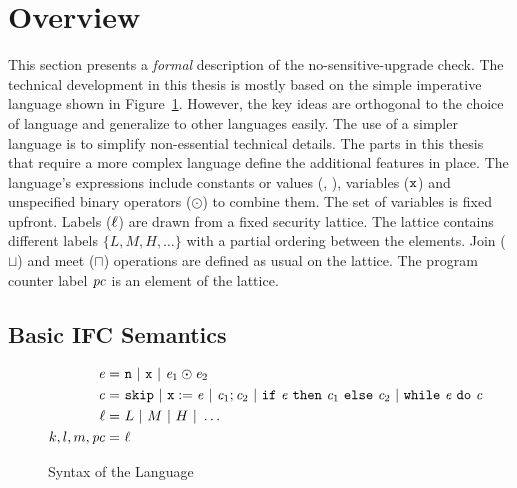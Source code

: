 \section{Overview}
This section presents a \emph{formal} description of the
no-sensitive-upgrade check. The technical development in this thesis
is mostly based on the simple imperative language shown in
Figure~\ref{basic:syntax}. However, the key ideas are orthogonal to
the choice of language and generalize to 
other languages easily. The use of a simpler language is to simplify
non-essential technical details. The parts in this thesis that require
a more complex language define the additional features in place. 
The language's expressions include constants or values (, ),
variables ($\texttt{x}$) and unspecified binary operators ($\odot$) to 
combine them. The set of variables is fixed upfront. Labels ($\ell$)
are drawn from a fixed security lattice. The lattice contains
different labels $\{L, M, H, \ldots \}$ with a partial ordering
between the elements. Join ($\sqcup$) and meet ($\sqcap$) operations
are defined as usual on the lattice. The program counter label $\mathit{pc}$
is an element of the lattice.

\subsection{Basic IFC Semantics}
\begin{figure}
\begin{align*}
\mathit{e}	=~& \texttt{n}~\arrowvert~\texttt{x}~\arrowvert~\mathit{e}_1 \odot \mathit{e}_2 \\
\mathit{c}	=~& \texttt{skip}~\arrowvert~\texttt{x} := \mathit{e}~\arrowvert 
 ~\mathit{c}_1;\mathit{c}_2~\arrowvert~\texttt{if}~\mathit{e}~\texttt{then}~\mathit{c}_1~\texttt{else}~\mathit{c}_2~\arrowvert~\texttt{while}~\mathit{e}~\texttt{do}~\mathit{c}\\
\ell          =~& L~\arrowvert~M~\arrowvert~H~\arrowvert~\ldots\\
k,l,m, \mathit{pc} =~& \ell
\end{align*}
\caption{Syntax of the Language}\label{basic:syntax}
\end{figure}


